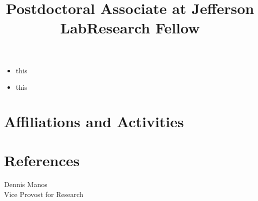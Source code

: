 \documentclass[overlapped,line,final,11pt,letterpaper]{res}
\begin{document}
\begin{resume}
\title{Postdoctoral Associate at Jefferson Lab}
\begin{position}
\vspace{-0.8\baselineskip}
\begin{itemize}
\item this
\end{itemize}
\end{position}

\title{Research Fellow}
\begin{position}
\vspace{-0.8\baselineskip}
\begin{itemize}
\item this
\end{itemize}
\end{position}


\section{\bf Affiliations and Activities}


\section{\bf References}

Dennis Manos \\
Vice Provost for Research \\



\end{resume}
\end{document}
